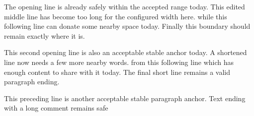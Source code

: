 \documentclass{article}
\begin{document}
The opening line is already safely within the accepted range today.
This edited middle line has become too long for the configured width
here. while this following line can donate some nearby space today.
Finally this boundary should remain exactly where it is.

This second opening line is also an acceptable stable anchor today.
A shortened line now needs a few more nearby words. from
this following line which has enough content to share with it today.
The final short line remains a valid paragraph ending.

This preceding line is another acceptable stable paragraph anchor.
Text ending with a long comment remains safe %
\end{document}
